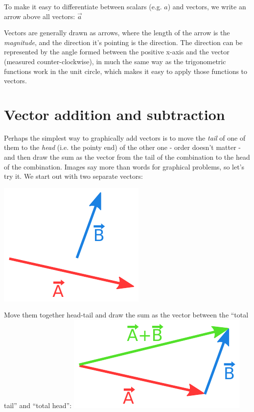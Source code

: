 \documentclass[8.01x]{subfiles}
\begin{document}
To make it easy to differentiate between scalars (e.g. $a$) and vectors, we write an arrow above all vectors: $\displaystyle \vec{a}$

Vectors are generally drawn as arrows, where the length of the arrow is the \emph{magnitude}, and the direction it's pointing is the direction. The direction can be represented by the angle formed between the positive x-axis and the vector (measured counter-clockwise), in much the same way as the trigonometric functions work in the unit circle, which makes it easy to apply those functions to vectors.

\section{Vector addition and subtraction}

Perhaps the simplest way to graphically add vectors is to move the \emph{tail} of one of them to the \emph{head} (i.e. the pointy end) of the other one - order doesn't matter - and then draw the sum as the vector from the tail of the combination to the head of the combination. Images say more than words for graphical problems, so let's try it. We start out with two separate vectors:

\includegraphics[scale=0.8]{Graphics/vectors/adding1}

Move them together head-tail and draw the sum as the vector between the ``total tail'' and ``total head'':
\includegraphics[scale=0.9]{Graphics/vectors/adding2}
\end{document}

